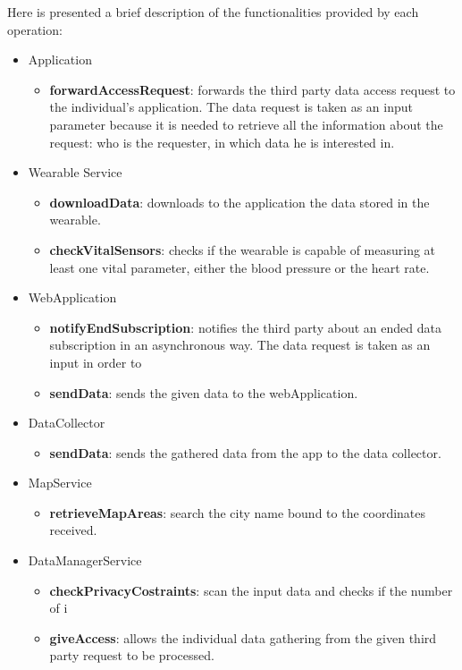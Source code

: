Here is presented a brief description of the functionalities provided by each operation:
\begin{itemize}
\item Application
\begin{itemize}
\item \textbf{forwardAccessRequest}: forwards the third party data access request to the individual's application. The data request is taken as an input parameter because it is needed to retrieve all the information about the request: who is the requester, in which data he is interested in.
\end{itemize}
\item Wearable Service
\begin{itemize}
\item \textbf{downloadData}: downloads to the application the data stored in the wearable.
\item \textbf{checkVitalSensors}: checks if the wearable is capable of measuring at least one vital parameter, either the blood pressure or the heart rate.
\end{itemize}
\item WebApplication
\begin{itemize}
\item \textbf{notifyEndSubscription}: notifies the third party about an ended data subscription in an asynchronous way. The data request is taken as an input in order to 
\item \textbf{sendData}: sends the given data to the webApplication.
\end{itemize}
\item DataCollector
\begin{itemize}
\item \textbf{sendData}: sends the gathered data from the app to the data collector.
\end{itemize}
\item MapService
\begin{itemize}
\item \textbf{retrieveMapAreas}: search the city name bound to the coordinates received.
\end{itemize}
\item DataManagerService
\begin{itemize}
\item \textbf{checkPrivacyCostraints}: scan the input data and checks if the number of i
\item \textbf{giveAccess}: allows the individual data gathering from the given third party request to be processed.

\end{itemize}
\end{itemize}
